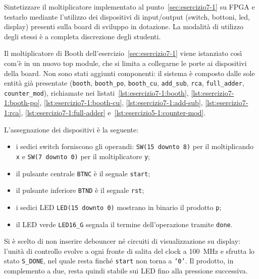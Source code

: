 \label{sec:esercizio7-2}

\begin{traccia}
Sintetizzare il moltiplicatore implementato al punto~\ref{sec:esercizio7-1} su FPGA e testarlo mediante l'utilizzo dei dispositivi di input/output (switch, bottoni, led, display) presenti sulla board di sviluppo in dotazione. La modalità di utilizzo degli stessi è a completa discrezione degli studenti.
\end{traccia}

\progetto

Il moltiplicatore di Booth dell'esercizio~\ref{sec:esercizio7-1} viene istanziato così com'è in un nuovo top module, che si limita a collegarne le porte ai dispositivi della board. Non sono stati aggiunti componenti: il sistema è composto dalle sole entità già presentate (\texttt{booth}, \texttt{booth\_po}, \texttt{booth\_cu}, \texttt{add\_sub}, \texttt{rca}, \texttt{full\_adder}, \texttt{counter\_mod}), richiamate nei listati~\ref{lst:esercizio7-1:booth}, \ref{lst:esercizio7-1:booth-po}, \ref{lst:esercizio7-1:booth-cu}, \ref{lst:esercizio7-1:add-sub}, \ref{lst:esercizio7-1:rca}, \ref{lst:esercizio7-1:full-adder} e~\ref{lst:esercizio5-1:counter-mod}.

L'assegnazione dei dispositivi è la seguente:

\begin{itemize}
  \item i sedici switch forniscono gli operandi: \texttt{SW(15 downto 8)} per il moltiplicando \texttt{x} e \texttt{SW(7 downto 0)} per il moltiplicatore \texttt{y};
  \item il pulsante centrale \texttt{BTNC} è il segnale \texttt{start};
  \item il pulsante inferiore \texttt{BTND} è il segnale \texttt{rst};
  \item i sedici LED \texttt{LED(15 downto 0)} mostrano in binario il prodotto \texttt{p};
  \item il LED verde \texttt{LED16\_G} segnala il termine dell'operazione tramite \texttt{done}.
\end{itemize}

Si è scelto di non inserire debouncer né circuiti di visualizzazione su display: l'unità di controllo evolve a ogni fronte di salita del clock a \SI{100}{MHz} e sfrutta lo stato \texttt{S\_DONE}, nel quale resta finché \texttt{start} non torna a \texttt{'0'}. Il prodotto, in complemento a due, resta quindi stabile sui LED fino alla pressione successiva.

